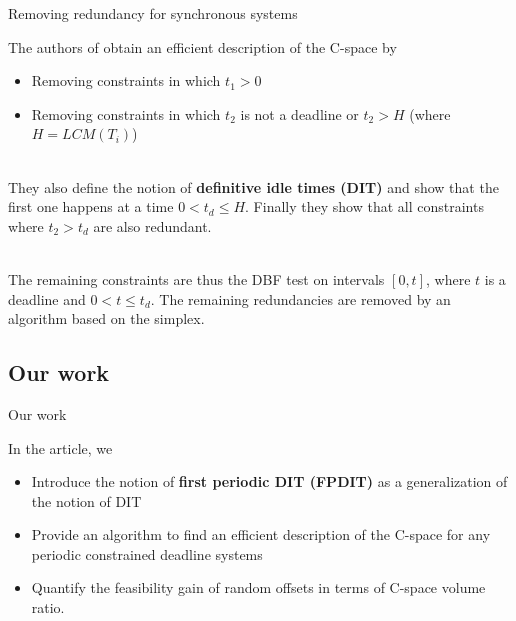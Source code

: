 \documentclass{beamer}
\begin{document}
    \begin{frame}{Removing redundancy for synchronous systems}

    The authors of \cite{george2009characterization} obtain an efficient description of the C-space by
    \begin{itemize}
        \item Removing constraints in which $t_1 > 0$
        \item Removing constraints in which $t_2$ is not a deadline or $t_2 > H$ (where $H = LCM(T_i)$)
    \end{itemize}

    ~\\

    They also define the notion of \textbf{definitive idle times (DIT)} and show that the first one happens at a time $0 < t_d \leqslant H$. Finally they show that all constraints where $t_2 > t_d$ are also redundant.

    ~\\

    The remaining constraints are thus the DBF test on intervals $[0, t]$, where $t$ is a deadline and $0 < t \leqslant t_d$. The remaining redundancies are removed by an algorithm based on the simplex.

    \end{frame}




	\subsection{Our work}

	\begin{frame}{Our work}

	In the article, we
    \begin{itemize}
        \item Introduce the notion of \textbf{first periodic DIT (FPDIT)} as a generalization of the notion of DIT
        \item Provide an algorithm to find an efficient description of the C-space for any periodic constrained deadline systems
        \item Quantify the feasibility gain of random offsets in terms of C-space volume ratio.
    \end{itemize}

	\end{frame}
\end{document}
